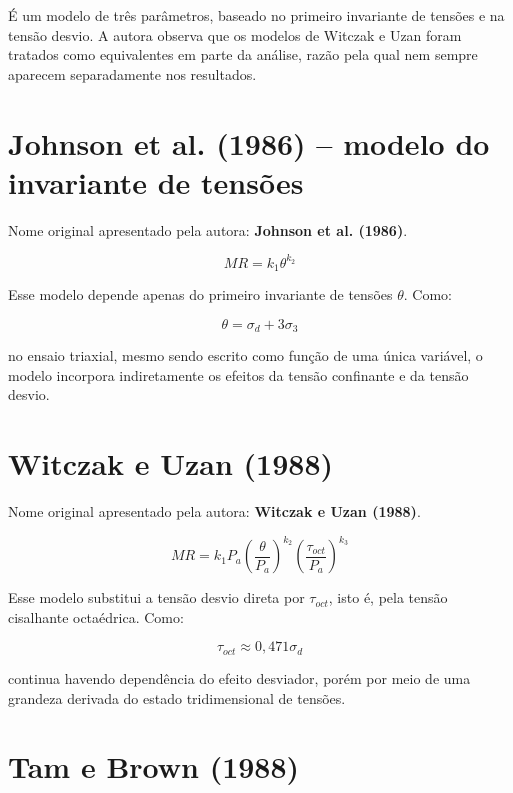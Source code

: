 \documentclass[12pt,a4paper]{article}
\begin{document}
É um modelo de três parâmetros, baseado no primeiro invariante de tensões e na tensão desvio. A autora observa que os modelos de Witczak e Uzan foram tratados como equivalentes em parte da análise, razão pela qual nem sempre aparecem separadamente nos resultados.

\section{Johnson et al. (1986) -- modelo do invariante de tensões}

Nome original apresentado pela autora: \textbf{Johnson et al. (1986)}.

\begin{equation}
MR=k_1\theta^{k_2}
\end{equation}

Esse modelo depende apenas do primeiro invariante de tensões $\theta$. Como:

\begin{equation}
\theta=\sigma_d+3\sigma_3
\end{equation}

no ensaio triaxial, mesmo sendo escrito como função de uma única variável, o modelo incorpora indiretamente os efeitos da tensão confinante e da tensão desvio.

\section{Witczak e Uzan (1988)}

Nome original apresentado pela autora: \textbf{Witczak e Uzan (1988)}.

\begin{equation}
MR=k_1P_a
\left(\frac{\theta}{P_a}\right)^{k_2}
\left(\frac{\tau_{oct}}{P_a}\right)^{k_3}
\end{equation}

Esse modelo substitui a tensão desvio direta por $\tau_{oct}$, isto é, pela tensão cisalhante octaédrica. Como:

\begin{equation}
\tau_{oct}\approx0{,}471\sigma_d
\end{equation}

continua havendo dependência do efeito desviador, porém por meio de uma grandeza derivada do estado tridimensional de tensões.

\section{Tam e Brown (1988)}
\end{document}
